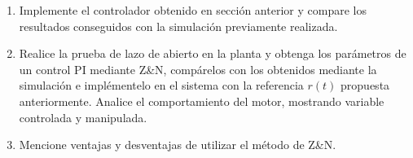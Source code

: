 \documentclass[11pt,letterpaper,notitlepage]{article}
\begin{document}
\begin{enumerate}[\bfseries {B}1]

\item Implemente el controlador obtenido en sección anterior y compare los resultados conseguidos con la simulación previamente realizada.

\item Realice la prueba de lazo de abierto en la planta y obtenga los parámetros de un control PI mediante Z\&N, compárelos con los obtenidos mediante la simulación e implémentelo en el sistema con la referencia $r(t)$ propuesta anteriormente. Analice el comportamiento del motor, mostrando variable controlada y manipulada.

\item Mencione ventajas y desventajas de utilizar el método de Z\&N.


\end{enumerate}
\end{document}

